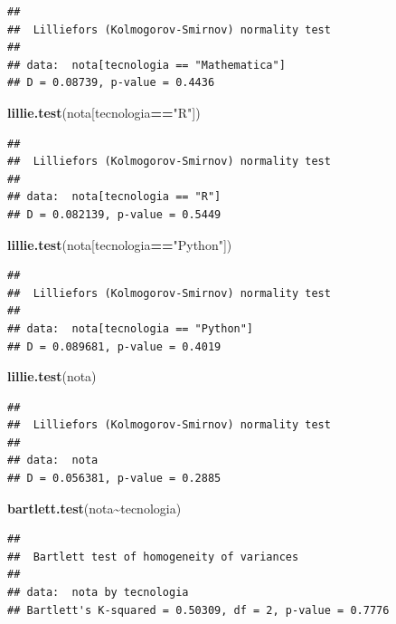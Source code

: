 \documentclass[
]{article}
\newenvironment{Shaded}{\begin{snugshade}}{\end{snugshade}}
\newcommand{\KeywordTok}[1]{\textcolor[rgb]{0.13,0.29,0.53}{\textbf{#1}}}
\newcommand{\NormalTok}[1]{#1}
\newcommand{\OperatorTok}[1]{\textcolor[rgb]{0.81,0.36,0.00}{\textbf{#1}}}
\newcommand{\StringTok}[1]{\textcolor[rgb]{0.31,0.60,0.02}{#1}}
\begin{document}
\begin{verbatim}
## 
##  Lilliefors (Kolmogorov-Smirnov) normality test
## 
## data:  nota[tecnologia == "Mathematica"]
## D = 0.08739, p-value = 0.4436
\end{verbatim}

\begin{Shaded}
\begin{Highlighting}[]
\KeywordTok{lillie.test}\NormalTok{(nota[tecnologia}\OperatorTok{==}\StringTok{"R"}\NormalTok{])}
\end{Highlighting}
\end{Shaded}

\begin{verbatim}
## 
##  Lilliefors (Kolmogorov-Smirnov) normality test
## 
## data:  nota[tecnologia == "R"]
## D = 0.082139, p-value = 0.5449
\end{verbatim}

\begin{Shaded}
\begin{Highlighting}[]
\KeywordTok{lillie.test}\NormalTok{(nota[tecnologia}\OperatorTok{==}\StringTok{"Python"}\NormalTok{])}
\end{Highlighting}
\end{Shaded}

\begin{verbatim}
## 
##  Lilliefors (Kolmogorov-Smirnov) normality test
## 
## data:  nota[tecnologia == "Python"]
## D = 0.089681, p-value = 0.4019
\end{verbatim}

\begin{Shaded}
\begin{Highlighting}[]
\KeywordTok{lillie.test}\NormalTok{(nota)}
\end{Highlighting}
\end{Shaded}

\begin{verbatim}
## 
##  Lilliefors (Kolmogorov-Smirnov) normality test
## 
## data:  nota
## D = 0.056381, p-value = 0.2885
\end{verbatim}

\begin{Shaded}
\begin{Highlighting}[]
\KeywordTok{bartlett.test}\NormalTok{(nota}\OperatorTok{\textasciitilde{}}\NormalTok{tecnologia)}
\end{Highlighting}
\end{Shaded}

\begin{verbatim}
## 
##  Bartlett test of homogeneity of variances
## 
## data:  nota by tecnologia
## Bartlett's K-squared = 0.50309, df = 2, p-value = 0.7776
\end{verbatim}
\end{document}
